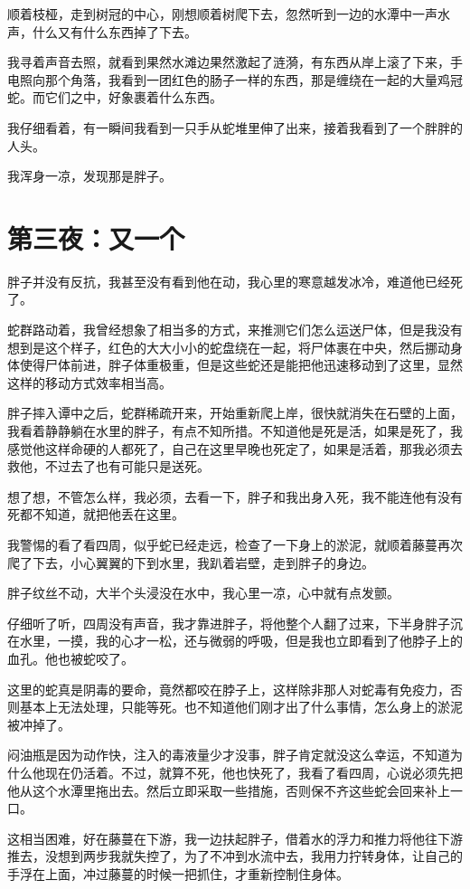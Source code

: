 顺着枝桠，走到树冠的中心，刚想顺着树爬下去，忽然听到一边的水潭中一声水声，什么又有什么东西掉了下去。

我寻着声音去照，就看到果然水滩边果然激起了涟漪，有东西从岸上滚了下来，手电照向那个角落，我看到一团红色的肠子一样的东西，那是缠绕在一起的大量鸡冠蛇。而它们之中，好象裹着什么东西。

我仔细看着，有一瞬间我看到一只手从蛇堆里伸了出来，接着我看到了一个胖胖的人头。

我浑身一凉，发现那是胖子。

\chapter{第三夜：又一个}

胖子并没有反抗，我甚至没有看到他在动，我心里的寒意越发冰冷，难道他已经死了。

蛇群路动着，我曾经想象了相当多的方式，来推测它们怎么运送尸体，但是我没有想到是这个样子，红色的大大小小的蛇盘绕在一起，将尸体裹在中央，然后挪动身体使得尸体前进，胖子体重极重，但是这些蛇还是能把他迅速移动到了这里，显然这样的移动方式效率相当高。

胖子摔入谭中之后，蛇群稀疏开来，开始重新爬上岸，很快就消失在石壁的上面，我看着静静躺在水里的胖子，有点不知所措。不知道他是死是活，如果是死了，我感觉他这样命硬的人都死了，自己在这里早晚也死定了，如果是活着，那我必须去救他，不过去了也有可能只是送死。

想了想，不管怎么样，我必须，去看一下，胖子和我出身入死，我不能连他有没有死都不知道，就把他丢在这里。

我警惕的看了看四周，似乎蛇已经走远，检查了一下身上的淤泥，就顺着藤蔓再次爬了下去，小心翼翼的下到水里，我趴着岩壁，走到胖子的身边。

胖子纹丝不动，大半个头浸没在水中，我心里一凉，心中就有点发颤。

仔细听了听，四周没有声音，我才靠进胖子，将他整个人翻了过来，下半身胖子沉在水里，一摸，我的心才一松，还与微弱的呼吸，但是我也立即看到了他脖子上的血孔。他也被蛇咬了。

这里的蛇真是阴毒的要命，竟然都咬在脖子上，这样除非那人对蛇毒有免疫力，否则基本上无法处理，只能等死。也不知道他们刚才出了什么事情，怎么身上的淤泥被冲掉了。

闷油瓶是因为动作快，注入的毒液量少才没事，胖子肯定就没这么幸运，不知道为什么他现在仍活着。不过，就算不死，他也快死了，我看了看四周，心说必须先把他从这个水潭里拖出去。然后立即采取一些措施，否则保不齐这些蛇会回来补上一口。

这相当困难，好在藤蔓在下游，我一边扶起胖子，借着水的浮力和推力将他往下游推去，没想到两步我就失控了，为了不冲到水流中去，我用力拧转身体，让自己的手浮在上面，冲过藤蔓的时候一把抓住，才重新控制住身体。


